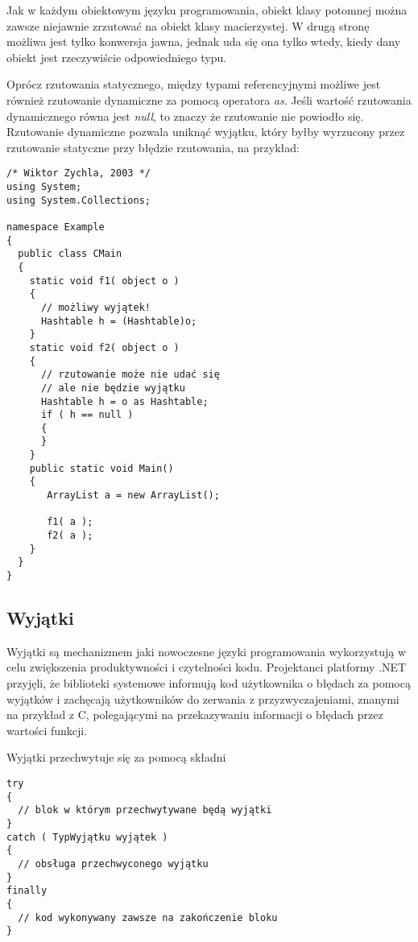 Jak w każdym obiektowym języku programowania, obiekt klasy potomnej można zawsze
niejawnie zrzutować na obiekt klasy macierzystej. W drugą stronę możliwa jest tylko
konwersja jawna, jednak uda się ona tylko wtedy, kiedy dany obiekt jest rzeczywiście
odpowiedniego typu.

Oprócz rzutowania statycznego, między typami referencyjnymi możliwe jest również
rzutowanie dynamiczne za pomocą operatora {\em as}. Jeśli wartość rzutowania dynamicznego
równa jest {\em null}, to znaczy że rzutowanie nie powiodło się. Rzutowanie dynamiczne
pozwala uniknąć wyjątku, który byłby wyrzucony przez rzutowanie statyczne przy błędzie rzutowania,
na przykład:

\begin{scriptsize}
\begin{verbatim}
/* Wiktor Zychla, 2003 */
using System;
using System.Collections;

namespace Example
{ 
  public class CMain
  {    
    static void f1( object o ) 
    {
      // możliwy wyjątek!
      Hashtable h = (Hashtable)o; 
    }
    static void f2( object o ) 
    {
      // rzutowanie może nie udać się
      // ale nie będzie wyjątku
      Hashtable h = o as Hashtable; 
      if ( h == null )
      {
      }
    }
    public static void Main()
    {
       ArrayList a = new ArrayList();

       f1( a );
       f2( a );
    }
  }
}
\end{verbatim}
\end{scriptsize}

\subsection{Wyjątki}

Wyjątki są mechanizmem jaki nowoczesne języki programowania wykorzystują w celu zwiększenia
produktywności i czytelności kodu. Projektanci platformy .NET przyjęli, że biblioteki systemowe
informują kod użytkownika o błędach za pomocą wyjątków i zachęcają użytkowników do zerwania z przyzwyczajeniami,
znanymi na przykład z C, polegającymi na przekazywaniu informacji o błędach przez wartości funkcji.

Wyjątki przechwytuje się za pomocą składni

\begin{scriptsize}
\begin{verbatim}
try
{
  // blok w którym przechwytywane będą wyjątki
}
catch ( TypWyjątku wyjątek )
{
  // obsługa przechwyconego wyjątku
}
finally 
{
  // kod wykonywany zawsze na zakończenie bloku
}
\end{verbatim}
\end{scriptsize}

